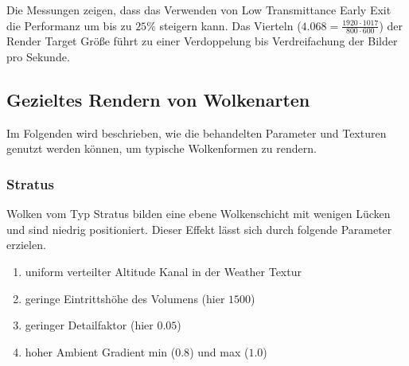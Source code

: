 \begin{table}[H]
\centering
\resizebox{\columnwidth}{!}{%
    \begin{tabular}{|c|c|c|c|c|}
        \hline
        - & 16 & 32 & 48 & 64\\
        \hline
        1 & 121 & 72 & 55 & 30\\
        \hline
        2 & 110 & 65 & 50 & 30\\
        \hline
        3 & 105 & 56 & 39 & 23\\
        \hline
        4 &  98 & 55 & 36 & 20\\
        \hline
    \end{tabular}
    
    \begin{tabular}{|c|c|c|c|c|}
        \hline
        - & 16 & 32 & 48 & 64\\
        \hline
        1 & 112 & 64 & 50 & 26\\
        \hline
        2 & 102 & 57 & 45 & 26\\
        \hline
        3 &  94 & 50 & 34 & 20\\
        \hline
        4 &  88 & 50 & 32 & 18\\
        \hline
    \end{tabular}}
\caption{800 x 600 - Mit und ohne Early Exit}
\label{tab:perf_2}
\end{table}

Die Messungen zeigen, dass das Verwenden von Low Transmittance Early Exit die Performanz um bis zu $ 25\% $ steigern kann. Das Vierteln ($ 4.068 = \frac{1920 \cdot 1017}{800 \cdot 600} $) der Render Target Größe führt zu einer Verdoppelung bis Verdreifachung der Bilder pro Sekunde.

\subsection{Gezieltes Rendern von Wolkenarten}
Im Folgenden wird beschrieben, wie die behandelten Parameter und Texturen genutzt werden können, um typische Wolkenformen zu rendern.

\subsubsection{Stratus}
Wolken vom Typ Stratus bilden eine ebene Wolkenschicht mit wenigen Lücken und sind niedrig positioniert. Dieser Effekt lässt sich durch folgende Parameter erzielen.

\begin{enumerate}
    \item uniform verteilter Altitude Kanal in der Weather Textur
    \item geringe Eintrittshöhe des Volumens (hier $ 1500 $)
    \item geringer Detailfaktor (hier $ 0.05 $)
    \item hoher Ambient Gradient min ($ 0.8 $) und max ($ 1.0 $)
\end{enumerate}

